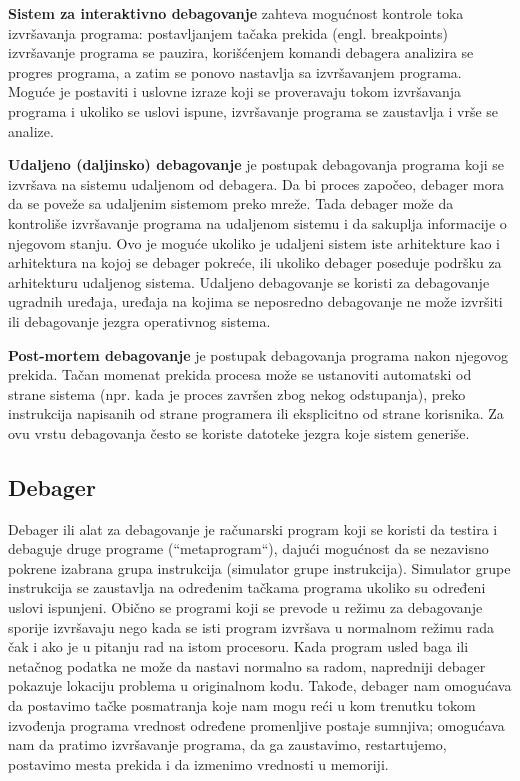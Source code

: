 \documentclass[a4paper]{article}
\begin{document}
\textbf{Sistem za interaktivno debagovanje} zahteva mogućnost kontrole toka izvršavanja
programa: postavljanjem tačaka prekida (engl. breakpoints) izvršavanje
programa se pauzira, korišćenjem komandi debagera analizira se progres
programa, a zatim se ponovo nastavlja sa izvršavanjem programa. Moguće
je postaviti i uslovne izraze koji se proveravaju tokom izvršavanja programa i ukoliko se uslovi ispune, izvršavanje programa se 
zaustavlja i vrše se analize.

\textbf{Udaljeno (daljinsko) debagovanje} je postupak debagovanja programa koji se izvršava
na sistemu udaljenom od debagera. Da bi proces započeo, debager mora
da se poveže sa udaljenim sistemom preko mreže. Tada debager može
da kontroliše izvršavanje programa na udaljenom sistemu i da sakuplja
informacije o njegovom stanju. Ovo je moguće ukoliko je udaljeni sistem
iste arhitekture kao i arhitektura na kojoj se debager pokreće, ili ukoliko
debager poseduje podršku za arhitekturu udaljenog sistema. Udaljeno debagovanje se koristi za 
debagovanje ugradnih uređaja, uređaja na kojima se neposredno debagovanje ne može izvršiti 
ili debagovanje jezgra operativnog sistema\cite{gdb}.

\textbf{Post-mortem debagovanje} je postupak debagovanja programa nakon njegovog prekida. Tačan momenat prekida procesa može se ustanoviti 
automatski od strane sistema (npr. kada je proces završen zbog nekog odstupanja), preko instrukcija napisanih od strane programera ili 
eksplicitno od strane korisnika. Za ovu vrstu debagovanja često se koriste datoteke jezgra koje sistem generiše\cite{vrste_deb}.

\subsection{Debager}
\label{subsec:debager}
Debager ili alat za debagovanje je računarski program koji se koristi da testira i 
debaguje druge programe (``metaprogram``), dajući mogućnost da se nezavisno 
pokrene izabrana grupa instrukcija (simulator grupe instrukcija). Simulator grupe instrukcija se zaustavlja
na određenim tačkama programa ukoliko su određeni uslovi ispunjeni.
Obično se programi koji se prevode u režimu za debagovanje
sporije izvršavaju nego kada se isti program izvršava u normalnom režimu rada čak i ako je 
u pitanju rad na istom procesoru\cite{debugger}.  Kada program usled baga ili netačnog podatka ne može da 
nastavi normalno sa radom, napredniji debager pokazuje lokaciju problema u originalnom kodu. Takođe,
debager nam omogućava da postavimo tačke posmatranja koje nam
mogu reći u kom trenutku tokom izvođenja programa vrednost
određene promenljive postaje sumnjiva; omogućava nam da
pratimo izvršavanje programa, da ga zaustavimo, restartujemo,
postavimo mesta prekida i da izmenimo vrednosti u memoriji. 
\end{document}
